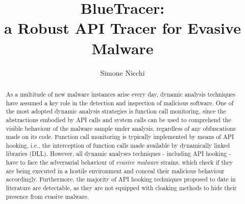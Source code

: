 \documentclass[LaM,english,noexaminfo,oneside]{sapthesis} %
\title{BlueTracer: \\ a Robust API Tracer for Evasive Malware}
\author{Simone Nicchi}
\begin{document}
\frontmatter
\maketitle
\dedication{Ai miei genitori, che non hanno mai smesso di supportarmi}

\begingroup
\clearpage%
\let\clearpage\relax%
\vspace*{-2cm}%


\begin{abstract}

\iffalse     
With thousands of new malware samples surfacing every day, dy-
namic analysis techniques play a fundamental role in the automatic
characterization and detection of malicious behaviors that under-
mine the security of computing systems. And yet, often new threats
emerge that defeat automatic analysis, requiring them to be manu-
ally dissected by expert analysts. A significant fraction of strains
adopt however evasion techniques that hide their malicious behav-
ior if they are under the magnifying glass of an analyst, hindering
the analysis. We propose a methodology for hardening automatic
dynamic analysis techniques to make them more robust against
evasive malware. We build on binary instrumentation and we show
that more than 100 different anti-evasion techniques can be imple-
mented in terms of a minimal core of primitives to withstand com-
mon evasive behaviors. We discuss an embodiment of our approach
in the Pin dynamic binary instrumentation framework showing
how to construct a customizable stealthy sandbox that supports
remote debugging and dynamic taint analysis. We evaluate our
tool on a set of highly evasive malware samples and show how
taint analysis can help analysts to identify new evasive techniques;
countermeasures can then be incorporated into the analysis system
as part of a human-assisted feedback loop mechanism.
\fi

As a multitude of new malware instances arise every day, dynamic analysis techniques have assumed a key role in the detection and inspection of malicious software. One of the most adopted dynamic analysis strategies is function call monitoring, since the abstractions embodied by API calls and system calls can be used to comprehend the visible behaviour of the malware sample under analysis, regardless of any obfuscations made on its code. Function call monitoring is typically implemented by means of API hooking, i.e., the interception of function calls made available by dynamically linked libraries (DLL). However, all dynamic analyses techniques - including API hooking - have to face the adversarial behaviour of \textit{evasive malware} strains, which check if they are being executed in a hostile environment and conceal their malicious behaviour accordingly. Furthermore, the majority of API hooking techniques proposed to date in literature are detectable, as they are not equipped with cloaking methods to hide their presence from evasive malware.


\end{abstract}
\end{document}
